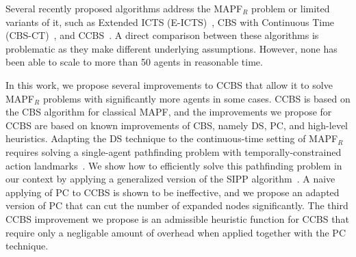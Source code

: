 \documentclass[letterpaper]{article} %
\newcommand{\cbs}{\ac{CBS}\xspace}
\newcommand{\ccbs}{\ac{CCBS}\xspace}
\newcommand{\sipp}{\ac{SIPP}\xspace}
\newcommand{\mapfr}{{MAPF}$_R$\xspace}
\newcommand{\mapf}{\ac{MAPF}\xspace}
\newcommand{\pc}{\ac{PC}\xspace}
\newcommand{\ds}{\ac{DS}\xspace}
\begin{document}
Several recently proposed algorithms address the \mapfr problem or limited variants of it, such as Extended ICTS (E-ICTS)~\cite{walker2018extended}, CBS with Continuous Time (CBS-CT)~\cite{cohen2019optimal}, and \ccbs~\cite{andreychuk2019multi}. A direct comparison between these algorithms is problematic as they make different underlying assumptions. 
However, none has been able to scale to more than 50 agents in reasonable time. %

In this work, we propose several improvements to \ccbs that allow it to solve \mapfr problems with significantly more agents in some cases. 
\ccbs is based on the \cbs algorithm for classical \mapf, and the improvements we propose for \ccbs are based on known improvements of \cbs, namely \ds, \pc, and high-level heuristics. 
Adapting the \ds technique to the continuous-time setting of \mapfr requires solving a single-agent pathfinding problem with temporally-constrained action landmarks~\cite{karpas2009cost}. 
We show how to efficiently solve this pathfinding problem in our context by applying a generalized version of the \sipp algorithm~\cite{phillips2011sipp}. 
A naive applying of \pc to \ccbs is shown to be ineffective, and we propose an adapted version of \pc that can cut the number of expanded nodes significantly. 
The third \ccbs improvement we propose is an admissible heuristic function for \ccbs that require only a negligable amount of overhead when applied together with the \pc technique. 
\end{document}
